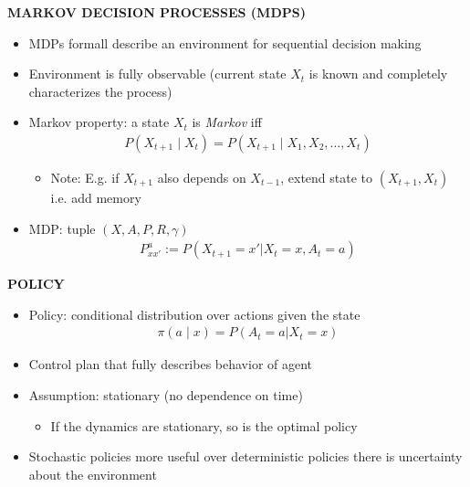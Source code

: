 \begin{whitebox}{\textbf{MARKOV DECISION PROCESSES (MDPS)}}
    \begin{itemize}
        \item MDPs formall describe an environment for sequential decision making
        \item Environment is fully observable (current state $X_t$ is known and completely characterizes the process)
        \item Markov property: a state $X_t$ is \textit{Markov} iff
        \begin{align*}
            P(X_{t+1}\mid X_t)=P(X_{t+1}\mid X_1,X_2,\dots,X_t)
        \end{align*}
        \begin{itemize}
            \item Note: E.g. if $X_{t+1}$ also depends on $X_{t-1}$, extend state to $(X_{t+1},X_t)$ i.e. add memory
        \end{itemize}
        \item MDP: tuple $(X,A,P,R,\gamma)$
        \begin{align*}
            P_{xx'}^a:=P(X_{t+1}=x'|X_t=x,A_t=a)
        \end{align*}
    \end{itemize}
\end{whitebox}

\begin{whitebox}{\textbf{POLICY}}
    \begin{itemize}
        \item Policy: conditional distribution over actions given the state
        \begin{align*}
            \pi(a\mid x)=P(A_t=a|X_t=x)
        \end{align*}
        \item Control plan that fully describes behavior of agent
        \item Assumption: stationary (no dependence on time)
        \begin{itemize}
            \item If the dynamics are stationary, so is the optimal policy
        \end{itemize}
        \item Stochastic policies more useful over deterministic policies there is uncertainty about the environment
    \end{itemize}
\end{whitebox}

